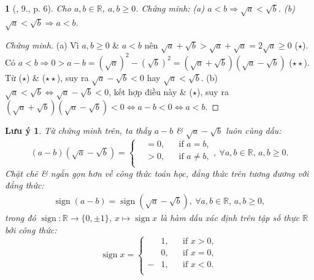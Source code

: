 \documentclass{article}
\newtheorem{baitoan}{}
\newtheorem{luuy}{Lưu ý}
\begin{document}
\begin{baitoan}[\cite{SBT_Toan_9_tap_1}, 9., p. 6]
	\label{SBT Toan 9 tap 1 9 p. 6}
	Cho $a,b\in\mathbb{R}$, $a,b\ge0$. Chứng minh: (a) $a < b\Rightarrow\sqrt{a} < \sqrt{b}$. (b) $\sqrt{a} < \sqrt{b}\Rightarrow a < b$. 
\end{baitoan}

\begin{proof}[Chứng minh]
	(a) Vì $a,b\ge0$ \& $a < b$ nên $\sqrt{a} + \sqrt{b} > \sqrt{a} + \sqrt{a} = 2\sqrt{a}\ge0$ ($\star$). Có $a < b\Rightarrow0 > a - b = (\sqrt{a})^2 - (\sqrt{b})^2 = (\sqrt{a} + \sqrt{b})(\sqrt{a} - \sqrt{b})$ ($\star\star$). Từ ($\star$) \& ($\star\star$), suy ra $\sqrt{a} - \sqrt{b} < 0$ hay  $\sqrt{a} < \sqrt{b}$. (b) $\sqrt{a} < \sqrt{b}\Leftrightarrow\sqrt{a} - \sqrt{b} < 0$, kết hợp điều này \& ($\star$), suy ra $(\sqrt{a} + \sqrt{b})(\sqrt{a} - \sqrt{b}) < 0\Leftrightarrow a - b < 0\Leftrightarrow a < b$.
\end{proof}

\begin{luuy}
	Từ chứng minh trên, ta thấy
	$a - b$ \& $\sqrt{a} - \sqrt{b}$ luôn cùng dấu:
	\begin{equation*}
		(a - b)(\sqrt{a} - \sqrt{b}) = \left\{\begin{split}
			&= 0,&&\mbox{if } a = b,\\
			&> 0,&&\mbox{if } a\ne b,\\
		\end{split}\right.,\ \forall a,b\in\mathbb{R},\,a,b\ge0.
	\end{equation*}
	Chặt chẽ \& ngắn gọn hơn về công thức toán học, đẳng thức trên tương đương với đẳng thức:
	\begin{align*}
		\operatorname{sign}(a - b) = \operatorname{sign}(\sqrt{a} - \sqrt{b}),\ \forall a,b\in\mathbb{R},\,a,b\ge0,
	\end{align*}
	trong đó $\operatorname{sign}:\mathbb{R}\to\{0,\pm1\}$, $x\mapsto\operatorname{sign}x$ là \emph{hàm dấu} xác định trên tập số thực $\mathbb{R}$ bởi công thức:
	\begin{equation*}
		\operatorname{sign}x = \left\{\begin{split}
			&1,&&\mbox{if } x > 0,\\
			&0,&&\mbox{if } x = 0,\\
			-&1,&&\mbox{if } x < 0.\\
		\end{split}\right.
	\end{equation*}
\end{luuy}
\end{document}
